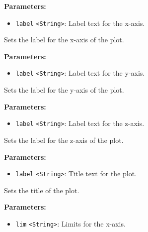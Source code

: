 \documentclass[12pt,a4paper]{article}
\begin{document}
\noindent \textbf{Parameters:}
\begin{itemize}
  \item \texttt{label} \texttt{<String>}: Label text for the x-axis.
\end{itemize}

\noindent Sets the label for the x-axis of the plot.

\vspace{5mm}
\noindent {}


\noindent \textbf{Parameters:}
\begin{itemize}
  \item \texttt{label} \texttt{<String>}: Label text for the y-axis.
\end{itemize}

\noindent Sets the label for the y-axis of the plot.

\vspace{5mm}
\noindent {}


\noindent \textbf{Parameters:}
\begin{itemize}
  \item \texttt{label} \texttt{<String>}: Label text for the z-axis.
\end{itemize}

\noindent Sets the label for the z-axis of the plot.

\vspace{5mm}
\noindent {}


\noindent \textbf{Parameters:}
\begin{itemize}
  \item \texttt{label} \texttt{<String>}: Title text for the plot.
\end{itemize}

\noindent Sets the title of the plot.

\vspace{5mm}
\noindent {}


\noindent \textbf{Parameters:}
\begin{itemize}
  \item \texttt{lim} \texttt{<String>}: Limits for the x-axis.
\end{itemize}
\end{document}
